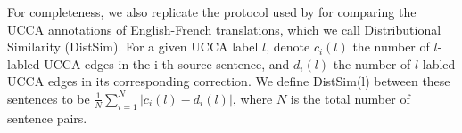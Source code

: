\documentclass[letter,11pt]{article}
\begin{document}
For completeness, we also replicate the protocol used by 
for comparing the UCCA annotations of English-French translations, which we call
Distributional Similarity ({\sc DistSim}).
For a given UCCA label $l$, denote $c_i(l)$ the number of $l$-labled UCCA edges
in the i-th source sentence, and $d_i(l)$ the number of $l$-labled UCCA edges
in its corresponding correction. We define {\sc DistSim}(l) between these
sentences to be $\frac{1}{N}\sum_{i=1}^N \vert c_i(l) - d_i(l) \vert$, where
$N$ is the total number of sentence pairs.
%
%
%
%
\end{document}
